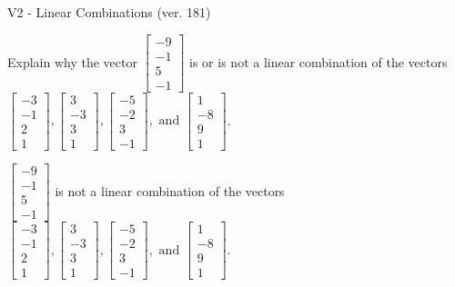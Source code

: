 \begin{exercise}
  \begin{exerciseTitle}V2 - Linear Combinations (ver. 181)\end{exerciseTitle}
  \begin{exerciseStatement}
    Explain why the vector \(\left[\begin{array}{c}
-9 \\
-1 \\
5 \\
-1
\end{array}\right]\)  is or is not a linear 
	combination of the vectors \(\left[\begin{array}{c}
-3 \\
-1 \\
2 \\
1
\end{array}\right] , \left[\begin{array}{c}
3 \\
-3 \\
3 \\
1
\end{array}\right] , \left[\begin{array}{c}
-5 \\
-2 \\
3 \\
-1
\end{array}\right] , \text{ and } \left[\begin{array}{c}
1 \\
-8 \\
9 \\
1
\end{array}\right]\).
	


  \end{exerciseStatement}
  \begin{exerciseAnswer}
   \(\left[\begin{array}{c}
-9 \\
-1 \\
5 \\
-1
\end{array}\right]\) 
  	 is not  
	a linear combination of the vectors \(\left[\begin{array}{c}
-3 \\
-1 \\
2 \\
1
\end{array}\right] , \left[\begin{array}{c}
3 \\
-3 \\
3 \\
1
\end{array}\right] , \left[\begin{array}{c}
-5 \\
-2 \\
3 \\
-1
\end{array}\right] , \text{ and } \left[\begin{array}{c}
1 \\
-8 \\
9 \\
1
\end{array}\right]\).


\end{exerciseAnswer}
\end{exercise}
